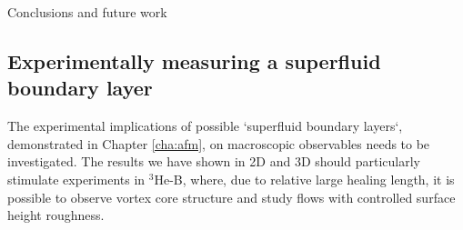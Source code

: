 \begin{chapter}{\label{cha:conc}Conclusions and future work}
\subsection{Experimentally measuring a superfluid boundary layer}
The experimental implications of possible `superfluid boundary layers`, demonstrated in Chapter \ref{cha:afm}, on macroscopic observables needs to be investigated.  The results we have shown in 2D and 3D should particularly stimulate experiments in $^3$He-B, where, due to relative
large healing length, it is possible to observe vortex core structure and study flows with controlled surface height roughness. 
\end{chapter}